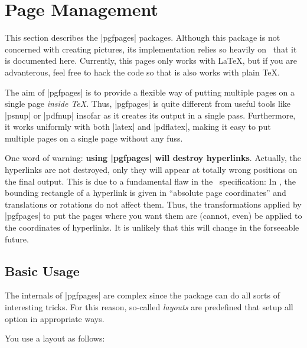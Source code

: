 %


\section{Page Management}

This section describes the |pgfpages| packages. Although this package
is not concerned with creating pictures, its implementation relies so
heavily on \pgfname\ that it is documented here. Currently, this pages
only works with \LaTeX, but if you are advanterous, feel free to hack
the code so that is also works with plain \TeX.

The aim of |pgfpages| is to provide a flexible way of putting multiple
pages on a single page \emph{inside \TeX}. Thus, |pgfpages| is quite
different from useful tools like |psnup| or |pdfnup| insofar as it
creates its output in a single pass. Furthermore, it works uniformly
with both |latex| and |pdflatex|, making it easy to put multiple pages
on a single page without any fuss.

One word of warning: \textbf{using |pgfpages| will destroy
  hyperlinks}. Actually, the hyperlinks are not destroyed, only they
will appear at totally wrong positions on the final output. This is
due to a fundamental flaw in the \pdf\ specification: In \pdf, the
bounding rectangle of a hyperlink is given in ``absolute
page coordinates'' and translations or rotations do not affect
them. Thus, the transformations applied by |pgfpages| to put the pages
where you want them are (cannot, even) be applied to the coordinates
of hyperlinks. It is unlikely that this will change in the forseeable
future.


\subsection{Basic Usage}

The internals of |pgfpages| are complex since the package can do all
sorts of interesting tricks. For this reason, so-called \emph{layouts}
are predefined that setup all option in appropriate ways.

You use a layout as follows:

